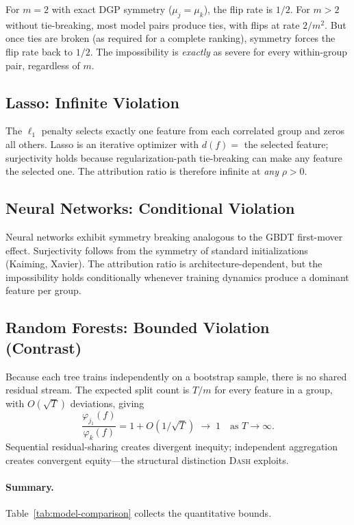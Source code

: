 \documentclass{article}
\newcommand{\DASH}{\textsc{Dash}}
\newcommand{\GBDT}{\textsc{GBDT}}
\begin{document}
For $m = 2$ with exact DGP symmetry ($\mu_j = \mu_k$), the flip rate is $1/2$. For $m > 2$ without tie-breaking, most model pairs produce ties, with flips at rate $2/m^2$. But once ties are broken (as required for a complete ranking), symmetry forces the flip rate back to $1/2$. The impossibility is \emph{exactly} as severe for every within-group pair, regardless of $m$.

\subsection{Lasso: Infinite Violation}
\label{sec:lasso}

The $\ell_1$ penalty selects exactly one feature from each correlated group and zeros all others. Lasso is an iterative optimizer with $d(f) =$ the selected feature; surjectivity holds because regularization-path tie-breaking can make any feature the selected one. The attribution ratio is therefore infinite at \emph{any} $\rho > 0$.

\subsection{Neural Networks: Conditional Violation}
\label{sec:nn}

Neural networks exhibit symmetry breaking analogous to the \GBDT{} first-mover effect. Surjectivity follows from the symmetry of standard initializations (Kaiming, Xavier). The attribution ratio is architecture-dependent, but the impossibility holds conditionally whenever training dynamics produce a dominant feature per group.

\subsection{Random Forests: Bounded Violation (Contrast)}
\label{sec:rf}

Because each tree trains independently on a bootstrap sample, there is no shared residual stream. The expected split count is $T/m$ for every feature in a group, with $O(\sqrt{T})$ deviations, giving
\[
    \frac{\varphi_{j_1}(f)}{\varphi_k(f)} = 1 + O(1/\sqrt{T}) \;\to\; 1 \quad \text{as } T \to \infty.
\]
Sequential residual-sharing creates divergent inequity; independent aggregation creates convergent equity---the structural distinction \DASH{} exploits.

\paragraph{Summary.}
Table~\ref{tab:model-comparison} collects the quantitative bounds.
\end{document}
